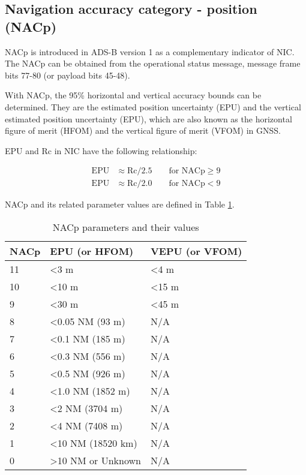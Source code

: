 \subsection{Navigation accuracy category - position (NACp)}

NACp is introduced in ADS-B version 1 as a complementary indicator of NIC. The NACp can be obtained from the operational status message, message frame bits 77-80 (or payload bits 45-48).

With NACp, the 95\% horizontal and vertical accuracy bounds can be determined. They are the estimated position uncertainty (EPU) and the vertical estimated position uncertainty (EPU), which are also known as the horizontal figure of merit (HFOM) and the vertical figure of merit (VFOM) in GNSS. 

EPU and Rc in NIC have the following relationship:

\begin{equation}
  \begin{split}
    \mathrm{EPU} &\approx \mathrm{Rc} / 2.5   \qquad  \text{for NACp} \ge 9 \\
    \mathrm{EPU} &\approx \mathrm{Rc} / 2.0  \qquad  \text{for NACp} < 9
  \end{split}
\end{equation}

NACp and its related parameter values are defined in Table \ref{tb:nacp-params}.

\begin{table}[]
\caption{NACp parameters and their values}
\label{tb:nacp-params}
\begin{tabular}{|l|l|l|}
\hline
\textbf{NACp} & \textbf{EPU (or HFOM)} & \textbf{VEPU (or VFOM)} \\ \hline \hline
11 & \textless 3 m & \textless 4 m \\ \hline
10 & \textless 10 m & \textless 15 m \\ \hline
9 & \textless 30 m & \textless 45 m \\ \hline
8 & \textless 0.05 NM (93 m) & N/A \\ \hline
7 & \textless 0.1 NM (185 m) & N/A \\ \hline
6 & \textless 0.3 NM (556 m) & N/A \\ \hline
5 & \textless 0.5 NM (926 m) & N/A \\ \hline
4 & \textless 1.0 NM (1852 m) & N/A \\ \hline
3 & \textless 2 NM (3704 m) & N/A \\ \hline
2 & \textless 4 NM (7408 m) & N/A \\ \hline
1 & \textless 10 NM (18520 km) & N/A \\ \hline
0 & \textgreater 10 NM or Unknown & N/A \\ \hline
\end{tabular}
\end{table}



